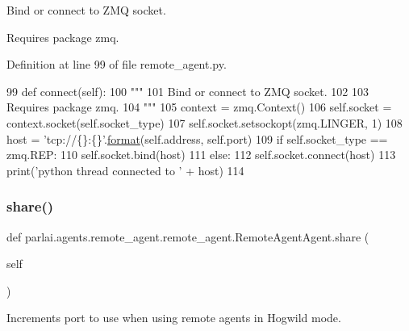 \begin{DoxyVerb}Bind or connect to ZMQ socket.

Requires package zmq.
\end{DoxyVerb}
 

Definition at line 99 of file remote\+\_\+agent.\+py.


\begin{DoxyCode}
99     \textcolor{keyword}{def }connect(self):
100         \textcolor{stringliteral}{"""}
101 \textcolor{stringliteral}{        Bind or connect to ZMQ socket.}
102 \textcolor{stringliteral}{}
103 \textcolor{stringliteral}{        Requires package zmq.}
104 \textcolor{stringliteral}{        """}
105         context = zmq.Context()
106         self.socket = context.socket(self.socket\_type)
107         self.socket.setsockopt(zmq.LINGER, 1)
108         host = \textcolor{stringliteral}{'tcp://\{\}:\{\}'}.\hyperlink{namespaceparlai_1_1chat__service_1_1services_1_1messenger_1_1shared__utils_a32e2e2022b824fbaf80c747160b52a76}{format}(self.address, self.port)
109         \textcolor{keywordflow}{if} self.socket\_type == zmq.REP:
110             self.socket.bind(host)
111         \textcolor{keywordflow}{else}:
112             self.socket.connect(host)
113         print(\textcolor{stringliteral}{'python thread connected to '} + host)
114 
\end{DoxyCode}
\mbox{\label{classparlai_1_1agents_1_1remote__agent_1_1remote__agent_1_1RemoteAgentAgent_afd3bccbdbd437024db9c0eacfd3b8519}} 
\subsubsection{\texorpdfstring{share()}{share()}}
{\footnotesize\ttfamily def parlai.\+agents.\+remote\+\_\+agent.\+remote\+\_\+agent.\+Remote\+Agent\+Agent.\+share (\begin{DoxyParamCaption}\item[{}]{self }\end{DoxyParamCaption})}

\begin{DoxyVerb}Increments port to use when using remote agents in Hogwild mode.
\end{DoxyVerb}
 

